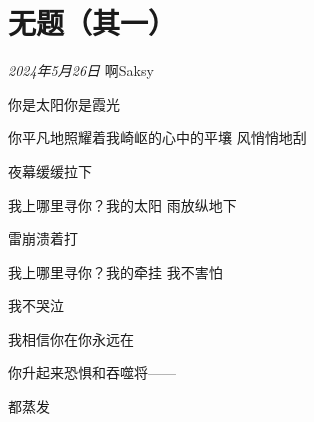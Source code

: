 \section*{无题（其一）}
\begin{center}
\textit{2024年5月26日}\hh 
啊\quad Saksy

你是太阳\quad 你是霞光

你平凡地照耀着我崎岖的\quad 心中的平壤\hh
风\quad 悄悄地刮

夜幕\quad 缓缓拉下

我上哪里寻你？\quad 我的太阳\hh
雨\quad 放纵地下

雷\quad 崩溃着打

我上哪里寻你？\quad 我的牵挂\hh
我不害怕

我不哭泣

我相信你在\quad 你永远在

你升起来\quad 恐惧和吞噬将——

都蒸发
\end{center}